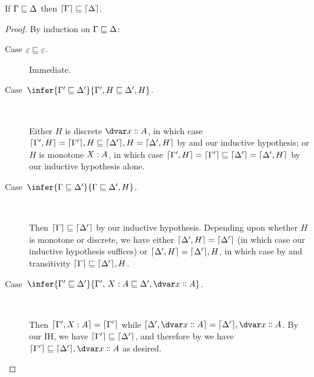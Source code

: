
\nextlemma
\begin{lemma}\label{lemma-weakening-strip-context}
  If $\Gamma \sqsubseteq \Delta$ then $\lceil{\Gamma}\rceil \sqsubseteq \lceil{\Delta}\rceil$.
\end{lemma}
\begin{proof}
  By induction on $\Gamma \sqsubseteq \Delta$:

  \begin{description}
    \item[Case $\varepsilon \sqsubseteq \varepsilon$.] Immediate.

  \item[Case\, $\infer{\Gamma' \weaker \Delta'}{\Gamma',H \weaker \Delta',H}$.]\

    Either $H$ is discrete $\hd x A$, in which case $\lceil{\Gamma',H}\rceil =
    \lceil{\Gamma'}\rceil, H \sqsubseteq \lceil{\Delta'}\rceil, H = \lceil{\Delta',H}\rceil$ by
     and our inductive hypothesis; or $H$ is monotone $\hm x A$, in
    which case $\lceil{\Gamma',H}\rceil = \lceil{\Gamma'}\rceil \sqsubseteq \lceil{\Delta'}\rceil = \lceil{\Delta',H}\rceil$ by our inductive hypothesis alone.

  \item[Case\, $\infer{\Gamma \weaker \Delta'}{\Gamma \weaker \Delta',H}$.]\

    Then $\lceil{\Gamma}\rceil \sqsubseteq \lceil{\Delta'}\rceil$ by our inductive
    hypothesis. Depending upon whether $H$ is monotone or discrete, we have
    either $\lceil{\Delta', H}\rceil = \lceil{\Delta'}\rceil$ (in which case our
    inductive hypothesis suffices) or $\lceil{\Delta', H}\rceil = \lceil{\Delta'}\rceil,
    H$, in which case by  and transitivity $\lceil{\Gamma}\rceil
    \sqsubseteq \lceil{\Delta'}\rceil, H$. 

  \item[Case\, $\infer{\Gamma' \weaker \Delta'}{\Gamma',\,\hm x A \weaker
      \Delta',\hd x A}$.]\

    Then $\stripcx{\Gamma', \hm x A} = \stripcx{\Gamma'}$ while
    $\stripcx{\Delta', \hd x A} = \stripcx{\Delta'}, \hd x A$. By our IH, we
    have $\lceil{\Gamma'}\rceil \sqsubseteq \lceil{\Delta'}\rceil$, and therefore by
     we have $\stripcx{\Gamma'} \weaker \stripcx{\Delta'}, \hd x A$ as
    desired.
  \end{description}
\end{proof}


\nextlemma
\Weakening*


